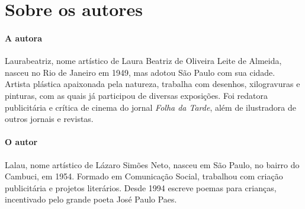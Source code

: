 \documentclass[11pt]{extarticle}
\begin{document}
\section{Sobre os autores}


\paragraph{A autora} Laurabeatriz, nome artístico de Laura Beatriz de Oliveira Leite de Almeida, nasceu no Rio de Janeiro em 1949, mas adotou São Paulo com sua cidade. Artista plástica apaixonada pela natureza, trabalha com desenhos, xilogravuras e pinturas, com as quais já participou de diversas exposições. Foi redatora publicitária e crítica de cinema do jornal \textit{Folha da Tarde}, além de ilustradora de outros jornais e revistas.

\paragraph{O autor} Lalau, nome artístico de Lázaro Simões Neto, nasceu em São Paulo, no bairro do Cambuci, em 1954. Formado em Comunicação Social, trabalhou com criação publicitária e projetos literários. Desde 1994 escreve poemas para crianças, incentivado pelo grande poeta José Paulo Paes.

\end{document}
